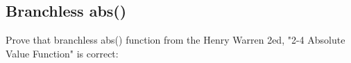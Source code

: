 \subsection{Branchless abs()}

Prove that branchless abs() function from the Henry Warren 2ed, "2-4 Absolute Value Function" is correct:



